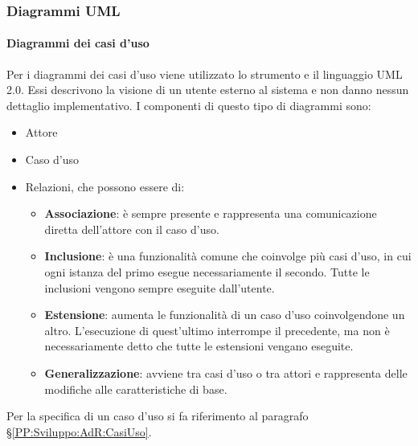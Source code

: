 		 
		\subsubsection{Diagrammi UML}\label{PP:Sviluppo:UML}	%


		\paragraph{Diagrammi dei casi d'uso}\label{DiagrammiCasiUso}
		Per i diagrammi dei casi d'uso viene utilizzato lo strumento  e il linguaggio UML 2.0. Essi descrivono la visione di un utente esterno al sistema e non danno
		nessun dettaglio implementativo. I componenti di questo tipo di diagrammi sono:
		\begin{itemize}
			\item Attore
			\item Caso d'uso
			\item Relazioni, che possono essere di:
			\begin{itemize}
				\item \textbf{Associazione}: è sempre presente e rappresenta una comunicazione diretta dell'attore con il caso d'uso.
				\item \textbf{Inclusione}: è una funzionalità comune che coinvolge più casi d'uso, in cui ogni istanza del primo esegue necessariamente il secondo. Tutte le inclusioni vengono sempre eseguite dall'utente.
				\item \textbf{Estensione}: aumenta le funzionalità di un caso d'uso coinvolgendone un altro. L'esecuzione di quest'ultimo interrompe il precedente, ma non è necessariamente detto che tutte le estensioni vengano eseguite.
				\item \textbf{Generalizzazione}: avviene tra casi d'uso o tra attori e rappresenta delle modifiche alle caratteristiche di base.
			\end{itemize}
		\end{itemize}
		Per la specifica di un caso d'uso si fa riferimento al paragrafo \S\ref{PP:Sviluppo:AdR:CasiUso}.





